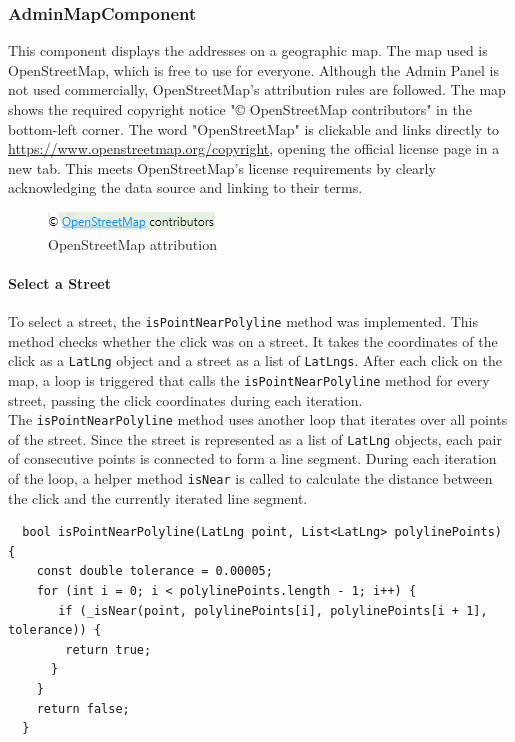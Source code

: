 \subsubsection{AdminMapComponent}
\label{fig:AdminMapComponent}
This component displays the addresses on a geographic map. The map used is OpenStreetMap, which is free to use for everyone. Although the Admin Panel is not used commercially, OpenStreetMap's attribution rules are followed. The map shows the required copyright notice "© OpenStreetMap contributors" in the bottom-left corner. The word "OpenStreetMap" is clickable and links directly to \url{https://www.openstreetmap.org/copyright}, opening the official license page in a new tab. This meets OpenStreetMap's license requirements by clearly acknowledging the data source and linking to their terms. \autocite{OpenStreetMap}

\begin{figure}[H]
    \centering
    \includegraphics[width=0.2\linewidth]{images/AdminPanel/Openstreetmapverweis.png}
    \caption{OpenStreetMap attribution}
\end{figure}




\paragraph{Select a Street}
\label{fig:Select Street}

To select a street, the \texttt{isPointNearPolyline} method was implemented. This method checks whether the click was on a street. It takes the coordinates of the click as a \texttt{LatLng} object and a street as a list of \texttt{LatLngs}. After each click on the map, a loop is triggered that calls the \texttt{isPointNearPolyline} method for every street, passing the click coordinates during each iteration.\\

The \texttt{isPointNearPolyline} method uses another loop that iterates over all points of the street. Since the street is represented as a list of \texttt{LatLng} objects, each pair of consecutive points is connected to form a line segment. During each iteration of the loop, a helper method \texttt{isNear} is called to calculate the distance between the click and the currently iterated line segment.


\lstset{style=mycsharp, caption=isPointNearPolyline method}
\begin{lstlisting}
  bool isPointNearPolyline(LatLng point, List<LatLng> polylinePoints) {
    const double tolerance = 0.00005;
    for (int i = 0; i < polylinePoints.length - 1; i++) {
       if (_isNear(point, polylinePoints[i], polylinePoints[i + 1], tolerance)) {
        return true;
      }
    }
    return false;
  }
\end{lstlisting}

